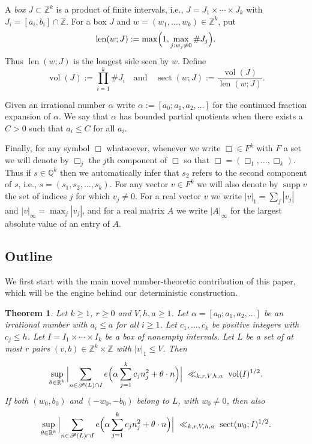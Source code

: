 \documentclass[a4paper,reqno,12pt]{amsart}
\theoremstyle{plain}
\newtheorem{theorem}{Theorem}
\theoremstyle{plain}
\theoremstyle{remark}
\theoremstyle{plain}
\newcommand{\cP}{\mathscr{P}}
\newcommand{\z}{\mathbb{Z}}
\newcommand{\RR}{\mathbb{R}}
\newcommand{\al}{\alpha}
\newcommand{\supp}{\operatorname{supp}}
\newcommand{\vol}{\operatorname{vol}}
\newcommand{\len}{\operatorname{len}}
\newcommand{\sect}{\operatorname{sect}}
\theoremstyle{plain}
\theoremstyle{plain}
\begin{document}
{A \emph{box} $J\subset \z^k$ is a product of finite intervals, i.e., 
$J=J_1\times\cdots\times J_k$ with $J_i = [a_i,b_i] \cap \mathbb{Z}$. 
For a box $J$ and $w = (w_1, \ldots, w_k) \in\z^k$, put
\[
  \len(w;J):=\max\Bigl(1,\max_{j : w_j \neq 0}\#J_j\Bigr).
\]
Thus $\len(w;J)$ is the longest side seen by $w$. Define
\[
\vol(J) := \prod_{i = 1}^{k} \# J_i \quad \text{and} \quad \sect(w;J):=\frac{\vol(J)}{\len(w;J)}.
\] 

Given an irrational number $\al$ write $\alpha := [a_0; a_1, a_2, \ldots]$ for the continued fraction
expansion of $\al$. We say that $\al$ has bounded partial quotients when there exists a $C > 0$ such
that $a_i \leq C$ for all $a_i$.

Finally, for any symbol $\Box$ whatsoever, whenever we write $\Box \in F^k$ with $F$ a set 
we will denote by $\Box_j$ the $j$th component of $\Box$ so that $\Box = (\Box_1, \ldots, \Box_k)$.   
Thus if $s \in \mathbb{Q}^k$ then we automatically infer that $s_2$ refers to the second component of $s$,
i.e., $s = (s_1, s_2, \ldots, s_k)$. For any vector $v \in F^k$ we will also denote by $\supp v$ the set of
indices $j$ for which $v_j \neq 0$. For a real vector $v$ we write $|v|_1=\sum_j|v_j|$ and
$|v|_\infty=\max_j|v_j|$, and for a real matrix $A$ we write $|A|_\infty$ for the largest absolute
value of an entry of $A$.

\subsection{Outline}\label{sec:outline}

We first start with the main novel {number-theoretic} contribution of this paper, which will be the engine behind our deterministic construction. 

\begin{theorem}\label{thm:box}
Let {$k\geq1$,} $r\ge 0$ and $V,h,a\ge1$. Let $\alpha = [a_0; a_1, a_2, \ldots]$ be
an irrational number with $a_i \leq a$ for all $i \geq 1$.  
Let $c_1,{\ldots},c_k$ be positive integers with
$c_j\le h$. Let $I=I_1\times\cdots\times I_k$
be a box of nonempty intervals. Let
$L$ be a set of at most $r$ pairs $(v,b)\in\mathbb Z^k\times
\mathbb Z$ with $|v|_1\le V$. Then
\[
\sup_{\theta \in \RR^k} \, \Bigl|\sum_{n\in \cP(L) \cap I}e\Bigl(\alpha\sum_{j=1}^kc_jn_j^2
+\theta\cdot n\Bigr)\Bigr|
\ \ll_{k,r,V,h,a}\ \vol(I)^{1/2}.
\]
If both $(w_0,b_0)$ and $(-w_0,-b_0)$ belong to $L$, with
$w_0\ne0$, then also
\[
\sup_{\theta \in \RR^k} \, \Bigl|\sum_{n\in \cP(L) \cap I}e\Bigl(\alpha\sum_{j=1}^kc_jn_j^2
+\theta\cdot n\Bigr)\Bigr|
\ \ll_{k,r,V,h,a}\ \sect(w_0;I)^{1/2}.
\]
\end{theorem}

}
\end{document}
